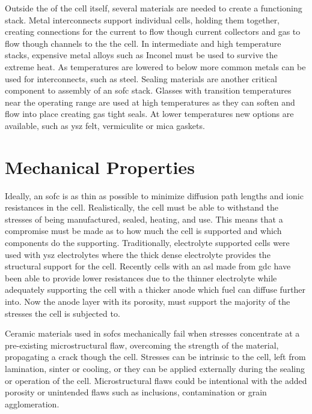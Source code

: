     Outside the of the cell itself, several materials are needed to create a functioning stack.
    Metal interconnects support individual cells, holding them together, creating connections for the current to flow though current collectors and gas to flow though channels to the the cell.\cite{Ki2010}
    In intermediate and high temperature stacks, expensive metal alloys such as Inconel must be used to survive the extreme heat.%
    As temperatures are lowered to below  more common metals can be used for interconnects, such as steel.
    Sealing materials are another critical component to assembly of an \gls{sofc} stack.
    Glasses with transition temperatures near the operating range are used at high temperatures as they can soften and flow into place creating gas tight seals.
    At lower temperatures new options are available, such as \gls{ysz} felt, vermiculite or mica gaskets.%

\section{Mechanical Properties}
    Ideally, an \gls{sofc} is as thin as possible to minimize diffusion path lengths and ionic resistances in the cell.\cite{Chan2001}
    Realistically, the cell must be able to withstand the stresses of being manufactured, sealed, heating, and use.
    This means that a compromise must be made as to how much the cell is supported and which components do the supporting.
    Traditionally, electrolyte supported cells were used with \gls{ysz} electrolytes where the thick dense electrolyte provides the structural support for the cell.
    Recently cells with an \gls{asl} made from \gls{gdc} have been able to provide lower resistances due to the thinner electrolyte while adequately supporting the cell with a thicker anode which fuel can diffuse further into.\cite{Fleischhauer2014a,Laurencin2008}
    Now the anode layer with its porosity, must support the majority of the stresses the cell is subjected to.

    Ceramic materials used in \glspl{sofc} mechanically fail when stresses concentrate at a pre-existing microstructural flaw, overcoming the strength of the material, propagating a crack though the cell.
    Stresses can be intrinsic to the cell, left from lamination, sinter or cooling, or they can be applied externally during the sealing or operation of the cell.
    Microstructural flaws could be intentional with the added porosity or unintended flaws such as inclusions, contamination or grain agglomeration.

